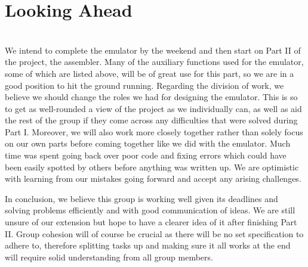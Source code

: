 \documentclass{article}
\begin{document}
\section{Looking Ahead}
\\

We intend to complete the emulator by the weekend and then start on Part II of the project, the assembler. Many of the auxiliary functions used for the emulator, some of which are listed above, will be of great use for this part, so we are in a good position to hit the ground running. Regarding the division of work, we believe we should change the roles we had for designing the emulator. This is so to get as well-rounded a view of the project as we individually can, as well as aid the rest of the group if they come across any difficulties that were solved during Part I. Moreover, we will also work more closely together rather than solely focus on our own parts before coming together like we did with the emulator. Much time was spent going back over poor code and fixing errors which could have been easily spotted by others before anything was written up. We are optimistic with learning from our mistakes going forward and accept any arising challenges.

In conclusion, we believe this group is working well given its deadlines and solving problems efficiently and with good communication of ideas. We are still unsure of our extension but hope to have a clearer idea of it after finishing Part II. Group cohesion will of course be crucial as there will be no set specification to adhere to, therefore splitting tasks up and making sure it all works at the end will require solid understanding from all group members.
\end{document}
